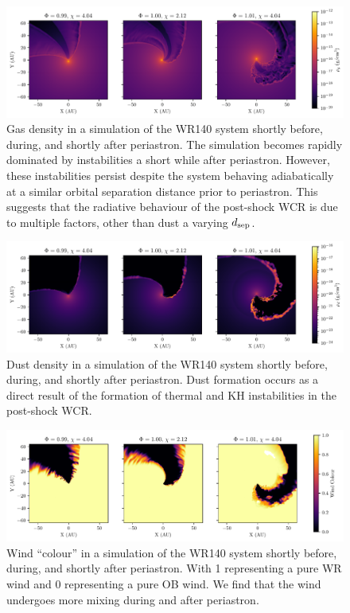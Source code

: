 \begin{figure}
  \centering
  \includegraphics[width=\linewidth]{assets/periastron-3-rho.pdf}
  \caption{Gas density in a simulation of the WR140 system shortly before, during, and shortly after periastron. The simulation becomes rapidly dominated by instabilities a short while after periastron. However, these instabilities persist despite the system behaving adiabatically at a similar orbital separation distance prior to periastron. This suggests that the radiative behaviour of the post-shock WCR is due to multiple factors, other than dust a varying $d_\text{sep}$.}
  \label{fig:p2-fullpage-rho}
\end{figure}

\begin{figure}
  \centering
  \includegraphics[width=\linewidth]{assets/periastron-3-rhod.pdf}
  \caption{Dust density in a simulation of the WR140 system shortly before, during, and shortly after periastron. Dust formation occurs as a direct result of the formation of thermal and KH instabilities in the post-shock WCR.}
  \label{fig:p2-fullpage-rhod}
\end{figure}

\begin{figure}
  \centering
  \includegraphics[width=\linewidth]{assets/periastron-3-r0.pdf}
  \caption{Wind ``colour'' in a simulation of the WR140 system shortly before, during, and shortly after periastron. With 1 representing a pure WR wind and 0 representing a pure OB wind. We find that the wind undergoes more mixing during and after periastron.}
  \label{fig:p2-fullpage-r0}
\end{figure}

